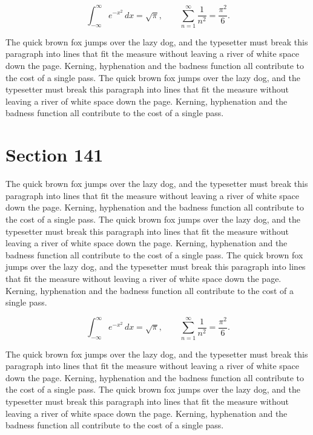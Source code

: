 \documentclass{article}
\begin{document}
\begin{equation}
\int_{-\infty}^{\infty} e^{-x^{2}}\,dx = \sqrt{\pi}, \qquad
\sum_{n=1}^{\infty} \frac{1}{n^{2}} = \frac{\pi^{2}}{6}.
\end{equation}

The quick brown fox jumps over the lazy dog, and the typesetter must break this paragraph into lines that fit the measure without leaving a river of white space down the page. Kerning, hyphenation and the badness function all contribute to the cost of a single pass. The quick brown fox jumps over the lazy dog, and the typesetter must break this paragraph into lines that fit the measure without leaving a river of white space down the page. Kerning, hyphenation and the badness function all contribute to the cost of a single pass. 
\section{Section 141}
The quick brown fox jumps over the lazy dog, and the typesetter must break this paragraph into lines that fit the measure without leaving a river of white space down the page. Kerning, hyphenation and the badness function all contribute to the cost of a single pass. The quick brown fox jumps over the lazy dog, and the typesetter must break this paragraph into lines that fit the measure without leaving a river of white space down the page. Kerning, hyphenation and the badness function all contribute to the cost of a single pass. The quick brown fox jumps over the lazy dog, and the typesetter must break this paragraph into lines that fit the measure without leaving a river of white space down the page. Kerning, hyphenation and the badness function all contribute to the cost of a single pass. 

\begin{equation}
\int_{-\infty}^{\infty} e^{-x^{2}}\,dx = \sqrt{\pi}, \qquad
\sum_{n=1}^{\infty} \frac{1}{n^{2}} = \frac{\pi^{2}}{6}.
\end{equation}

The quick brown fox jumps over the lazy dog, and the typesetter must break this paragraph into lines that fit the measure without leaving a river of white space down the page. Kerning, hyphenation and the badness function all contribute to the cost of a single pass. The quick brown fox jumps over the lazy dog, and the typesetter must break this paragraph into lines that fit the measure without leaving a river of white space down the page. Kerning, hyphenation and the badness function all contribute to the cost of a single pass. 
\end{document}
